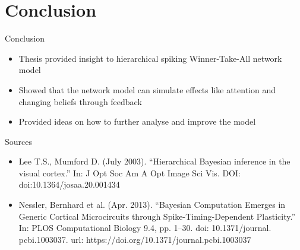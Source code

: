 \documentclass[aspectratio=169]{beamer}
\begin{document}
\section*{Conclusion}

\begin{frame}{Conclusion}
  \begin{itemize}
	\item Thesis provided insight to hierarchical spiking Winner-Take-All network model
	\item Showed that the network model can simulate effects like attention and changing beliefs through feedback
	\item Provided ideas on how to further analyse and improve the model
  \end{itemize}
\end{frame}


\begin{frame}{Sources}
    \begin{itemize}
    \item  Lee T.S., Mumford D. (July 2003). “Hierarchical Bayesian inference in the
 visual cortex.” In: J Opt Soc Am A Opt Image Sci Vis. DOI: doi:10.1364/josaa.20.001434
    \item Nessler, Bernhard et al. (Apr. 2013). “Bayesian Computation Emerges in
 Generic Cortical Microcircuits through Spike-Timing-Dependent Plasticity.” In: PLOS Computational Biology 9.4, pp. 1–30. doi: 10.1371/journal.
 pcbi.1003037. url: https://doi.org/10.1371/journal.pcbi.1003037
  \end{itemize}

\end{frame}
\end{document}
